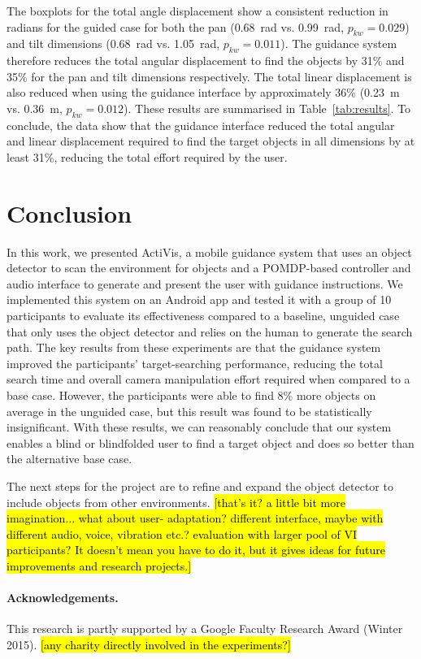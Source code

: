 \documentclass[runningheads]{llncs}
\DeclareRobustCommand{\tofix}[1]{{\sethlcolor{yellow}\hl{[#1]}}}
\begin{document}
The boxplots for the total angle displacement show a consistent reduction in radians for the guided case for both the pan (\SI{0.68}{\radian} vs. \SI{0.99}{\radian}, $p_{kw}=0.029$) and tilt dimensions (\SI{0.68}{\radian} vs. \SI{1.05}{\radian}, $p_{kw}=0.011$). 
The guidance system therefore reduces the total angular displacement to find the objects by 31\% and 35\% for the pan and tilt dimensions respectively. 
The total linear displacement is also reduced when using the guidance interface by approximately 36\% (\SI{0.23}{\metre} vs. \SI{0.36}{\metre}, $p_{kw}=0.012$).
These results are summarised in Table~\ref{tab:results}.
To conclude, the data show that the guidance interface reduced the total angular and linear displacement required to find the target objects in all dimensions by at least 31\%, reducing the total effort required by the user. 


\section{Conclusion}\label{sec:conclusion}

In this work, we presented ActiVis, a mobile guidance system that uses an object detector to scan the environment for objects and a POMDP-based controller and audio interface to generate and present the user with guidance instructions. 
We implemented this system on an Android app and tested it with a group of 10 participants to evaluate its effectiveness compared to a baseline, unguided case that only uses the object detector and relies on the human to generate the search path. 
The key results from these experiments are that the guidance system improved the participants' target-searching performance, reducing the total search time and overall camera manipulation effort required when compared to a base case.
However, the participants were able to find 8\% more objects on average in the unguided case, but this result was found to be statistically insignificant. 
With these results, we can reasonably conclude that our system enables a blind or blindfolded user to find a target object and does so better than the alternative base case.

The next steps for the project are to refine and expand the object detector to include objects from other environments. \tofix{that's it? a little bit more imagination... what about user- adaptation? different interface, maybe with different audio, voice, vibration etc.? evaluation with larger pool of VI participants? It doesn't mean you have to do it, but it gives ideas for future improvements and research projects.}

\paragraph{{\bf Acknowledgements.}}\label{sec:acknowledge}
This research is partly supported by a Google Faculty Research Award (Winter 2015).
\tofix{any charity directly involved in the experiments?}




\end{document}
